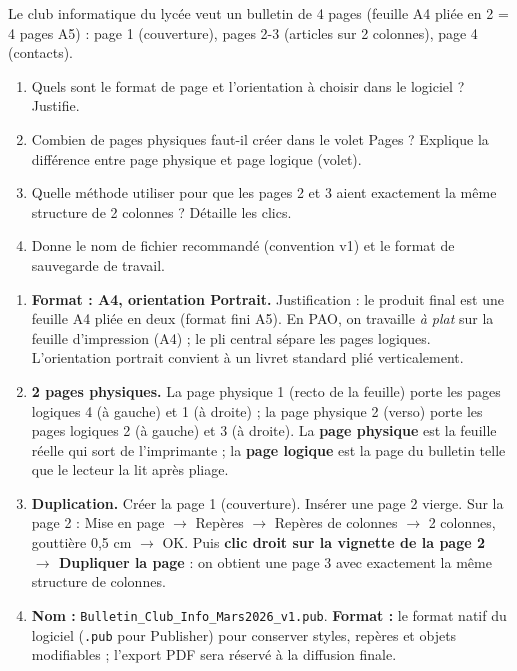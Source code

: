 \documentclass[11pt]{article}
\begin{document}
\begin{exercice}
Le club informatique du lycée veut un bulletin de 4 pages (feuille A4 pliée en 2 = 4 pages A5) : page 1 (couverture), pages 2-3 (articles sur 2 colonnes), page 4 (contacts).
\begin{enumerate}
    \item Quels sont le format de page et l'orientation à choisir dans le logiciel ? Justifie.
    \item Combien de pages physiques faut-il créer dans le volet Pages ? Explique la différence entre page physique et page logique (volet).
    \item Quelle méthode utiliser pour que les pages 2 et 3 aient exactement la même structure de 2 colonnes ? Détaille les clics.
    \item Donne le nom de fichier recommandé (convention v1) et le format de sauvegarde de travail.
\end{enumerate}
\end{exercice}

\begin{corrige}
\begin{enumerate}
    \item \textbf{Format : A4, orientation Portrait.} Justification : le produit final est une feuille A4 pliée en deux (format fini A5). En PAO, on travaille \emph{à plat} sur la feuille d'impression (A4) ; le pli central sépare les pages logiques. L'orientation portrait convient à un livret standard plié verticalement.
    \item \textbf{2 pages physiques.} La page physique 1 (recto de la feuille) porte les pages logiques 4 (à gauche) et 1 (à droite) ; la page physique 2 (verso) porte les pages logiques 2 (à gauche) et 3 (à droite). La \textbf{page physique} est la feuille réelle qui sort de l'imprimante ; la \textbf{page logique} est la page du bulletin telle que le lecteur la lit après pliage.
    \item \textbf{Duplication.} Créer la page 1 (couverture). Insérer une page 2 vierge. Sur la page 2 : Mise en page $\rightarrow$ Repères $\rightarrow$ Repères de colonnes $\rightarrow$ 2 colonnes, gouttière 0,5 cm $\rightarrow$ OK. Puis \textbf{clic droit sur la vignette de la page 2 $\rightarrow$ Dupliquer la page} : on obtient une page 3 avec exactement la même structure de colonnes.
    \item \textbf{Nom :} \texttt{Bulletin\_Club\_Info\_Mars2026\_v1.pub}. \textbf{Format :} le format natif du logiciel (\texttt{.pub} pour Publisher) pour conserver styles, repères et objets modifiables ; l'export PDF sera réservé à la diffusion finale.
\end{enumerate}
\end{corrige}
\end{document}
